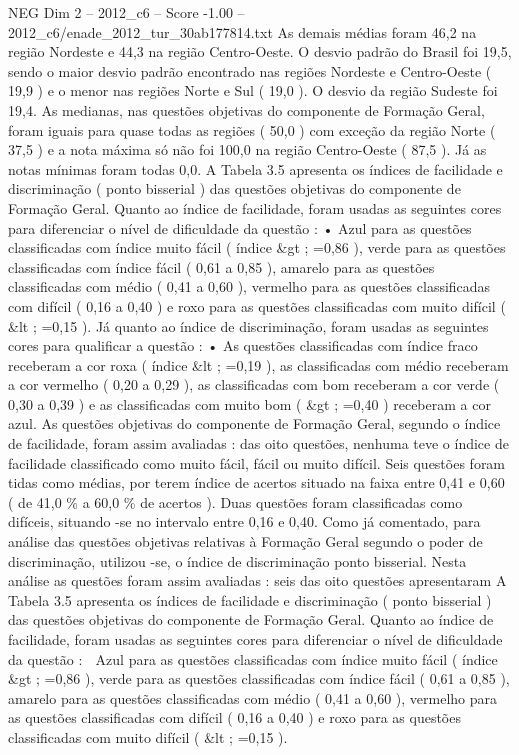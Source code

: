\begin{textsample}{NEG Dim 2 – 2012\_c6 – Score -1.00 – 2012\_c6/enade\_2012\_tur\_30ab177814.txt}
As demais médias foram 46,2 na região Nordeste e 44,3 na região Centro-Oeste.
O desvio padrão do Brasil foi 19,5, sendo o maior desvio padrão encontrado nas regiões Nordeste e Centro-Oeste ( 19,9 ) e o menor nas regiões Norte e Sul ( 19,0 ).
O desvio da região Sudeste foi 19,4.
As medianas, nas questões objetivas do componente de Formação Geral, foram iguais para quase todas as regiões ( 50,0 ) com exceção da região Norte ( 37,5 ) e a nota máxima só não foi 100,0 na região Centro-Oeste ( 87,5 ).
Já as notas mínimas foram todas 0,0.
A Tabela 3.5 apresenta os índices de facilidade e discriminação ( ponto bisserial ) das questões objetivas do componente de Formação Geral.
Quanto ao índice de facilidade, foram usadas as seguintes cores para diferenciar o nível de dificuldade da questão : • Azul para as questões classificadas com índice muito fácil ( índice \&gt ; =0,86 ), verde para as questões classificadas com índice fácil ( 0,61 a 0,85 ), amarelo para as questões classificadas com médio ( 0,41 a 0,60 ), vermelho para as questões classificadas com difícil ( 0,16 a 0,40 ) e roxo para as questões classificadas com muito difícil ( \&lt ; =0,15 ).
Já quanto ao índice de discriminação, foram usadas as seguintes cores para qualificar a questão : • As questões classificadas com índice fraco receberam a cor roxa ( índice \&lt ; =0,19 ), as classificadas com médio receberam a cor vermelho ( 0,20 a 0,29 ), as classificadas com bom receberam a cor verde ( 0,30 a 0,39 ) e as classificadas com muito bom ( \&gt ; =0,40 ) receberam a cor azul.
As questões objetivas do componente de Formação Geral, segundo o índice de facilidade, foram assim avaliadas : das oito questões, nenhuma teve o índice de facilidade classificado como muito fácil, fácil ou muito difícil.
Seis questões foram tidas como médias, por terem índice de acertos situado na faixa entre 0,41 e 0,60 ( de 41,0 \% a 60,0 \% de acertos ).
Duas questões foram classificadas como difíceis, situando -se no intervalo entre 0,16 e 0,40.
Como já comentado, para análise das questões objetivas relativas à Formação Geral segundo o poder de discriminação, utilizou -se, o índice de discriminação ponto bisserial.
Nesta análise as questões foram assim avaliadas : seis das oito questões apresentaram A Tabela 3.5 apresenta os índices de facilidade e discriminação ( ponto bisserial ) das questões objetivas do componente de Formação Geral.
Quanto ao índice de facilidade, foram usadas as seguintes cores para diferenciar o nível de dificuldade da questão :  Azul para as questões classificadas com índice muito fácil ( índice \&gt ; =0,86 ), verde para as questões classificadas com índice fácil ( 0,61 a 0,85 ), amarelo para as questões classificadas com médio ( 0,41 a 0,60 ), vermelho para as questões classificadas com difícil ( 0,16 a 0,40 ) e roxo para as questões classificadas com muito difícil ( \&lt ; =0,15 ).

\end{textsample}
